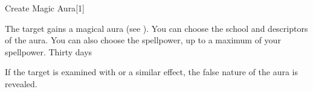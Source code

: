 \begin{spellsection}{Create Magic Aura}[1]
    \begin{spellheader}
    \end{spellheader}
    \begin{spellcontent}
        \begin{spelltargetinginfo}
        \end{spelltargetinginfo}
        \begin{spelleffects}
            \spelleffect The target gains a magical aura (see ). You can choose the school and descriptors of the aura. You can also choose the spellpower, up to a maximum of your spellpower.
            \spelldur Thirty days \dismissable
        \end{spelleffects}
    \end{spellcontent}
    \begin{spellfooter}
        \spellnotes If the target is examined with  or a similar effect, the false nature of the aura is revealed.
    \end{spellfooter}
    \begin{spellaugments}
    \end{spellaugments}
\end{spellsection}

